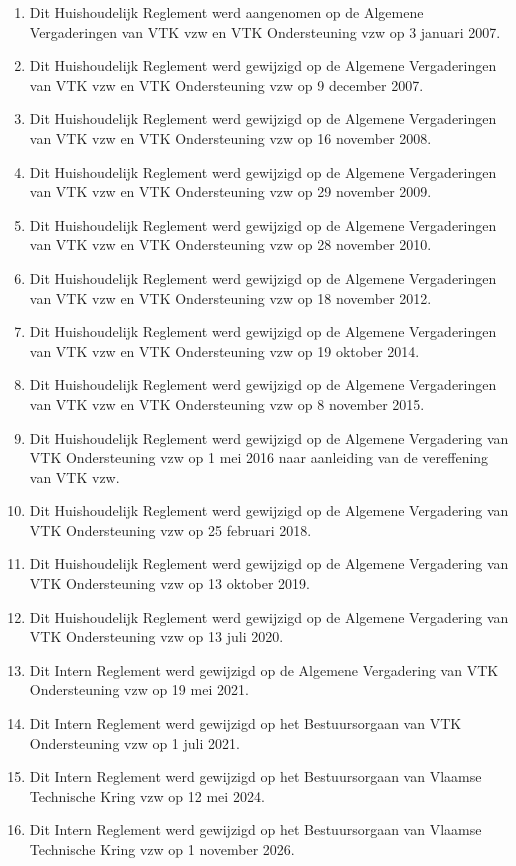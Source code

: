     \begin{enumerate}
    \item Dit Huishoudelijk Reglement werd aangenomen op de Algemene Vergaderingen van VTK vzw en VTK Ondersteuning vzw op 3 januari 2007.
    \item Dit Huishoudelijk Reglement werd gewijzigd op de Algemene Vergaderingen van VTK vzw en VTK Ondersteuning vzw op 9 december 2007.
    \item Dit Huishoudelijk Reglement werd gewijzigd op de Algemene Vergaderingen van VTK vzw en VTK Ondersteuning vzw op 16 november 2008. 
    \item Dit Huishoudelijk Reglement werd gewijzigd op de Algemene Vergaderingen van VTK vzw en VTK Ondersteuning vzw op 29 november 2009.
    \item Dit Huishoudelijk Reglement werd gewijzigd op de Algemene Vergaderingen van VTK vzw en VTK Ondersteuning vzw op 28 november 2010.
    \item Dit Huishoudelijk Reglement werd gewijzigd op de Algemene Vergaderingen van VTK vzw en VTK Ondersteuning vzw op 18 november 2012.
    \item Dit Huishoudelijk Reglement werd gewijzigd op de Algemene Vergaderingen van VTK vzw en VTK Ondersteuning vzw op 19 oktober 2014.
    \item Dit Huishoudelijk Reglement werd gewijzigd op de Algemene Vergaderingen van VTK vzw en VTK Ondersteuning vzw op 8 november 2015.
    \item Dit Huishoudelijk Reglement werd gewijzigd op de Algemene Vergadering van VTK Ondersteuning vzw op 1 mei 2016 naar aanleiding van de vereffening van VTK vzw.
    \item Dit Huishoudelijk Reglement werd gewijzigd op de Algemene Vergadering van VTK Ondersteuning vzw op 25 februari 2018.
    \item Dit Huishoudelijk Reglement werd gewijzigd op de Algemene Vergadering van VTK Ondersteuning vzw op 13 oktober 2019.
    \item Dit Huishoudelijk Reglement werd gewijzigd op de Algemene Vergadering van VTK Ondersteuning vzw op 13 juli 2020.
    \item Dit Intern Reglement werd gewijzigd op de Algemene Vergadering van VTK Ondersteuning vzw op 19 mei 2021.
    \item Dit Intern Reglement werd gewijzigd op het Bestuursorgaan van VTK Ondersteuning vzw op 1 juli 2021.
    \item Dit Intern Reglement werd gewijzigd op het Bestuursorgaan van Vlaamse Technische Kring vzw op 12 mei 2024.
    \item Dit Intern Reglement werd gewijzigd op het Bestuursorgaan van Vlaamse Technische Kring vzw op 1 november 2026.
    \end{enumerate}

